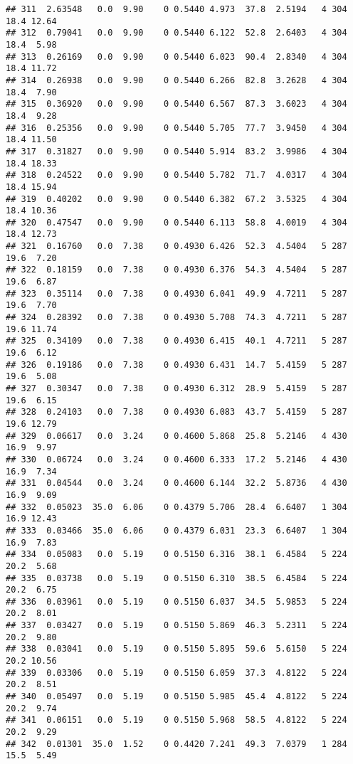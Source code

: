\documentclass[
]{article}
\begin{document}
\begin{verbatim}
## 311  2.63548   0.0  9.90    0 0.5440 4.973  37.8  2.5194   4 304    18.4 12.64
## 312  0.79041   0.0  9.90    0 0.5440 6.122  52.8  2.6403   4 304    18.4  5.98
## 313  0.26169   0.0  9.90    0 0.5440 6.023  90.4  2.8340   4 304    18.4 11.72
## 314  0.26938   0.0  9.90    0 0.5440 6.266  82.8  3.2628   4 304    18.4  7.90
## 315  0.36920   0.0  9.90    0 0.5440 6.567  87.3  3.6023   4 304    18.4  9.28
## 316  0.25356   0.0  9.90    0 0.5440 5.705  77.7  3.9450   4 304    18.4 11.50
## 317  0.31827   0.0  9.90    0 0.5440 5.914  83.2  3.9986   4 304    18.4 18.33
## 318  0.24522   0.0  9.90    0 0.5440 5.782  71.7  4.0317   4 304    18.4 15.94
## 319  0.40202   0.0  9.90    0 0.5440 6.382  67.2  3.5325   4 304    18.4 10.36
## 320  0.47547   0.0  9.90    0 0.5440 6.113  58.8  4.0019   4 304    18.4 12.73
## 321  0.16760   0.0  7.38    0 0.4930 6.426  52.3  4.5404   5 287    19.6  7.20
## 322  0.18159   0.0  7.38    0 0.4930 6.376  54.3  4.5404   5 287    19.6  6.87
## 323  0.35114   0.0  7.38    0 0.4930 6.041  49.9  4.7211   5 287    19.6  7.70
## 324  0.28392   0.0  7.38    0 0.4930 5.708  74.3  4.7211   5 287    19.6 11.74
## 325  0.34109   0.0  7.38    0 0.4930 6.415  40.1  4.7211   5 287    19.6  6.12
## 326  0.19186   0.0  7.38    0 0.4930 6.431  14.7  5.4159   5 287    19.6  5.08
## 327  0.30347   0.0  7.38    0 0.4930 6.312  28.9  5.4159   5 287    19.6  6.15
## 328  0.24103   0.0  7.38    0 0.4930 6.083  43.7  5.4159   5 287    19.6 12.79
## 329  0.06617   0.0  3.24    0 0.4600 5.868  25.8  5.2146   4 430    16.9  9.97
## 330  0.06724   0.0  3.24    0 0.4600 6.333  17.2  5.2146   4 430    16.9  7.34
## 331  0.04544   0.0  3.24    0 0.4600 6.144  32.2  5.8736   4 430    16.9  9.09
## 332  0.05023  35.0  6.06    0 0.4379 5.706  28.4  6.6407   1 304    16.9 12.43
## 333  0.03466  35.0  6.06    0 0.4379 6.031  23.3  6.6407   1 304    16.9  7.83
## 334  0.05083   0.0  5.19    0 0.5150 6.316  38.1  6.4584   5 224    20.2  5.68
## 335  0.03738   0.0  5.19    0 0.5150 6.310  38.5  6.4584   5 224    20.2  6.75
## 336  0.03961   0.0  5.19    0 0.5150 6.037  34.5  5.9853   5 224    20.2  8.01
## 337  0.03427   0.0  5.19    0 0.5150 5.869  46.3  5.2311   5 224    20.2  9.80
## 338  0.03041   0.0  5.19    0 0.5150 5.895  59.6  5.6150   5 224    20.2 10.56
## 339  0.03306   0.0  5.19    0 0.5150 6.059  37.3  4.8122   5 224    20.2  8.51
## 340  0.05497   0.0  5.19    0 0.5150 5.985  45.4  4.8122   5 224    20.2  9.74
## 341  0.06151   0.0  5.19    0 0.5150 5.968  58.5  4.8122   5 224    20.2  9.29
## 342  0.01301  35.0  1.52    0 0.4420 7.241  49.3  7.0379   1 284    15.5  5.49

\end{verbatim}
\end{document}
